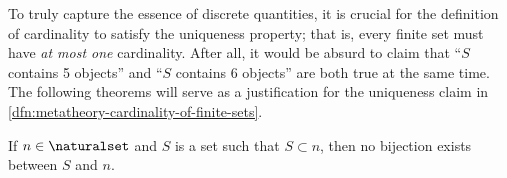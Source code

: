 \begin{rem}
    To truly capture the essence of discrete quantities, it is crucial for the definition of cardinality
    to satisfy the uniqueness property; that is, every finite set must have \emph{at most one} cardinality.
    After all, it would be absurd to claim that ``\( S \) contains 5 objects'' and ``\( S \) contains 6 objects'' are both true at
    the same time.
    The following theorems will serve as a justification for the uniqueness claim in \cref{dfn:metatheory-cardinality-of-finite-sets}.
\end{rem}

\begin{thm}
     \label{thm:metatheory-no-bijection-exists-between-a-natural-number-and-its-proper-subset}
    If \( n \in \naturalset \) and \( S \) is a set such that \( S \subset n \), then no bijection exists between \( S \) and \( n \).
\end{thm}


